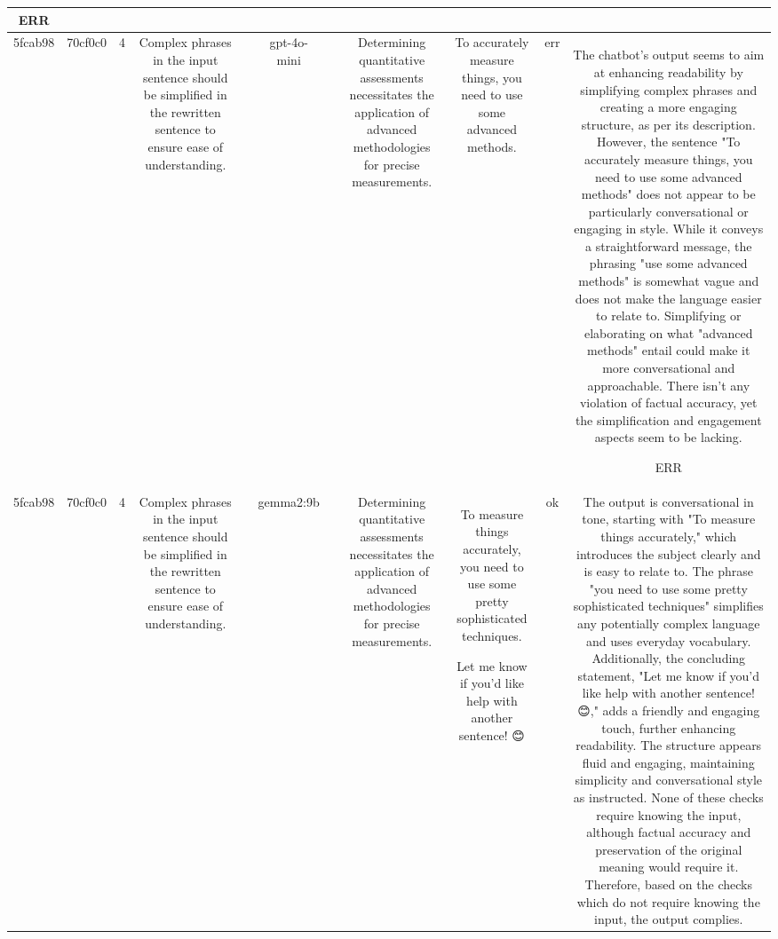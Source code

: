 \begin{table}[h!]
\begin{tabular}{|c|c|c|c|c|c|c|c|c|c|c|}
ERR\\
\hline
5fcab98 & 70cf0c0 & 4 & Complex phrases in the input sentence should be simplified in the rewritten sentence to ensure ease of understanding. &  & gpt-4o-mini &  & Determining quantitative assessments necessitates the application of advanced methodologies for precise measurements. & To accurately measure things, you need to use some advanced methods. & err & The chatbot's output seems to aim at enhancing readability by simplifying complex phrases and creating a more engaging structure, as per its description. However, the sentence "To accurately measure things, you need to use some advanced methods" does not appear to be particularly conversational or engaging in style. While it conveys a straightforward message, the phrasing "use some advanced methods" is somewhat vague and does not make the language easier to relate to. Simplifying or elaborating on what "advanced methods" entail could make it more conversational and approachable. There isn't any violation of factual accuracy, yet the simplification and engagement aspects seem to be lacking.

ERR\\
\hline
5fcab98 & 70cf0c0 & 4 & Complex phrases in the input sentence should be simplified in the rewritten sentence to ensure ease of understanding. &  & gemma2:9b &  & Determining quantitative assessments necessitates the application of advanced methodologies for precise measurements. & To measure things accurately, you need to use some pretty sophisticated techniques.  


Let me know if you'd like help with another sentence! 😊 
 & ok & The output is conversational in tone, starting with "To measure things accurately," which introduces the subject clearly and is easy to relate to. The phrase "you need to use some pretty sophisticated techniques" simplifies any potentially complex language and uses everyday vocabulary. Additionally, the concluding statement, "Let me know if you'd like help with another sentence! 😊," adds a friendly and engaging touch, further enhancing readability. The structure appears fluid and engaging, maintaining simplicity and conversational style as instructed. None of these checks require knowing the input, although factual accuracy and preservation of the original meaning would require it. Therefore, based on the checks which do not require knowing the input, the output complies.


\end{tabular}
\end{table}
